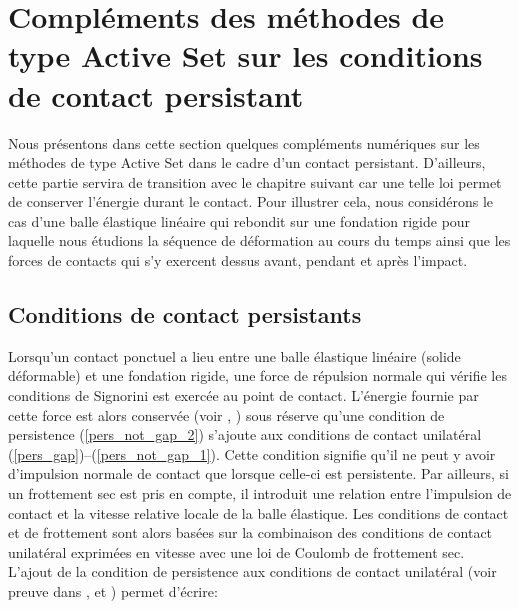 
\section{Compléments des méthodes de type Active Set sur les conditions de contact persistant}\label{complement_persistant}

Nous présentons dans cette section quelques compléments numériques sur les méthodes de type Active Set dans le cadre d'un contact persistant. D'ailleurs, cette partie servira de transition avec le chapitre suivant car une telle loi permet de conserver l'énergie durant le contact. Pour illustrer cela, nous considérons le cas d'une balle élastique linéaire qui rebondit sur une fondation rigide pour laquelle nous étudions la séquence de déformation au cours du temps ainsi que les forces de contacts qui s'y exercent dessus avant, pendant et après l'impact.  

\subsection{Conditions de contact persistants}\label{cont_cond}

Lorsqu'un contact ponctuel a lieu entre une balle élastique linéaire (solide déformable) et une fondation rigide, une force de répulsion normale qui vérifie les conditions de Signorini est exercée au point de contact. L'énergie fournie par cette force est alors conservée (voir \cite{laursen2013computational}, \cite{laursen1997design}) sous réserve qu'une condition de persistence (\ref{pers_not_gap_2}) s'ajoute aux conditions de contact unilatéral (\ref{pers_gap})--(\ref{pers_not_gap_1}). Cette condition signifie qu'il ne peut y avoir d'impulsion normale de contact que lorsque celle-ci est persistente. Par ailleurs, si un frottement sec est pris en compte, il introduit une relation entre l'impulsion de contact et la vitesse relative locale de la balle élastique. Les conditions de contact et de frottement sont alors basées sur la combinaison des conditions de contact unilatéral  exprimées en vitesse avec une loi de Coulomb de frottement sec. L'ajout de la condition de persistence aux conditions de contact unilatéral (voir preuve dans \cite{laursen2013computational}, \cite{moreau1994numerical} et \cite{moreau1999sweeping}) permet d'écrire:


